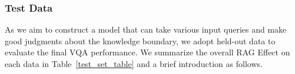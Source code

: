 \begin{table}[t]
\centering
\small
\caption{Training set sources and statistics. Answers are sampled from Qwen-VL-7B-Chat (QW) \cite{Qwen-VL} DeepSeek-VL-7B-Chat (DS) \cite{lu2024deepseekvl} respectively. Scores are evaluated by Qwen-Max \cite{qwen1.5}}
\label{training_set_table}
\end{table}


\subsubsection{Test Data}

As we aim to construct a model that can take various input queries and make good judgments about the knowledge boundary, we adopt held-out data to evaluate the final VQA performance. We summarize the overall RAG Effect on each data in Table~\ref{test_set_table} and a brief introduction as follows. 


